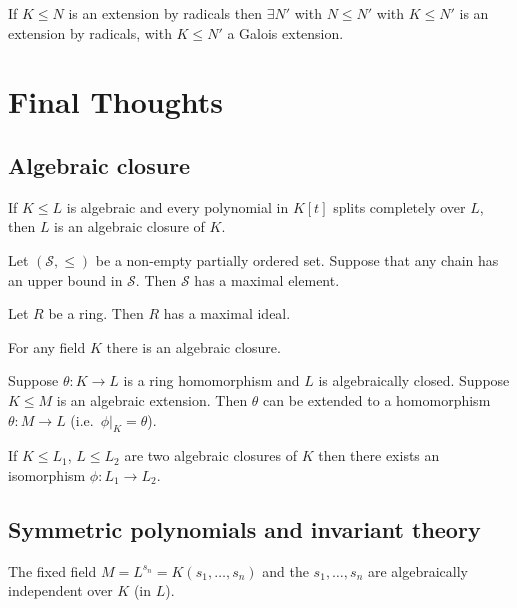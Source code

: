 \documentclass{article}
\begin{document}
\begin{nlemma}\label{lem:4.24}
    If $K \leq N$ is an extension by radicals then $\exists N'$ with $N \leq N'$ with $K \leq N'$ is an extension by radicals, with $K \leq N'$ a Galois extension.
\end{nlemma}




\clearpage
\section{Final Thoughts}
\subsection{Algebraic closure}



\begin{nlemma}\label{lem:5.3}
    If $K \leq L$ is algebraic and every polynomial in $K[t]$ splits completely over $L$, then $L$ is an algebraic closure of $K$.
\end{nlemma}



\begin{nlemma}\label{lem:zorn}
    Let $(\mathcal{S},\leq)$ be a non-empty partially ordered set.
    Suppose that any chain has an upper bound in $\mathcal{S}$.
    Then $\mathcal{S}$ has a maximal element.
\end{nlemma}
\begin{nlemma}\label{lem:5.6}
    Let $R$ be a ring. Then $R$ has a maximal ideal.
\end{nlemma}

\begin{nthm}\label{thm:5.7}
    For any field $K$ there is an algebraic closure.
\end{nthm}

\begin{nthm}\label{thm:5.8}
    Suppose $\theta: K \to L$ is a ring homomorphism and $L$ is algebraically closed.
    Suppose $K \leq M$ is an algebraic extension.
    Then $\theta$ can be extended to a homomorphism $\theta: M \to L$ (i.e.\ $\phi|_K = \theta$).
\end{nthm}

\begin{nthm}\label{thm:5.9}
    If $K \leq L_1$, $L \leq L_2$ are two algebraic closures of $K$ then there exists an isomorphism $\phi:L_1 \to L_2$.
\end{nthm}

\subsection{Symmetric polynomials and invariant theory}


















\begin{nthm}\label{thm:5.11}
    The fixed field $M = L^{s_n} = K(s_1, \dotsc, s_n)$ and the $s_1, \dotsc, s_n$ are algebraically independent over $K$ (in $L$).
\end{nthm}
\end{document}
